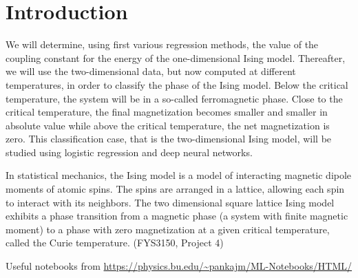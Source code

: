 \section{Introduction}\label{sec:Introduction}
We will determine, using first various regression methods, the value of the coupling constant for the energy of the one-dimensional Ising model. Thereafter, we will use the two-dimensional data, but now computed at different temperatures, in order to classify the phase of the Ising model. Below the critical temperature, the system will be in a so-called ferromagnetic phase. Close to the critical temperature, the final magnetization becomes smaller and smaller in absolute value while above the critical temperature, the net magnetization is zero. This classification case, that is the two-dimensional Ising model, will be studied using logistic regression and deep neural networks.


In statistical mechanics, the Ising model is a model of interacting magnetic dipole moments of atomic spins. The spins are arranged in a lattice, allowing each spin to interact with its neighbors. The two dimensional square lattice Ising model exhibits a phase transition from a magnetic phase (a system with finite magnetic moment) to a phase with zero magnetization at a given critical temperature, called the Curie temperature. (FYS3150, Project 4)


Useful notebooks from \cite{Mehta_2019} \url{https://physics.bu.edu/~pankajm/ML-Notebooks/HTML/}